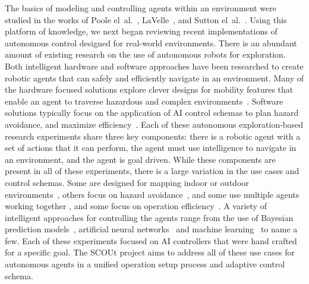 The basics of modeling and controlling agents within an environment were studied in the works of Poole el~al.~\cite{poole_artificial_2010}, LaVelle~\cite{lavalle_planning_2006}, and Sutton el~al.~\cite{sutton_reinforcement_1998}.
Using this platform of knowledge, we next began reviewing recent implementations of autonomous control designed for real-world environments.
There is an abundant amount of existing research on the use of autonomous robots for exploration.
Both intelligent hardware and software approaches have been researched to create robotic agents that can safely and efficiently navigate in an environment.
Many of the hardware focused solutions explore clever designs for mobility features that enable an agent to traverse hazardous and complex environments~\cite{kossett_robust_2011, hopkins_survey_2009, haldane_animal-inspired_2013, hoover_bio-inspired_2010, latscha_design_2014, clark_evolving_2017, smith_tri-wheel:_2015, clark_toward_2006}.
Software solutions typically focus on the application of AI control schemas to plan hazard avoidance, and maximize efficiency~\cite{christensen_multi-robot_2017, tai_autonomous_2017, stachniss_exploration_2004, clark_mobile_2007, perea_strom_robust_2017, fink_tier-scalable_2007, bai_toward_2017}.
Each of these autonomous exploration-based research experiments share three key components: there is a robotic agent with a set of actions that it can perform, the agent must use intelligence to navigate in an environment, and the agent is goal driven.
While these components are present in all of these experiments, there is a large variation in the use cases and control schemas.
Some are designed for mapping indoor or outdoor environments~\cite{tai_autonomous_2017,  stachniss_exploration_2004, perea_strom_robust_2017}, others focus on hazard avoidance~\cite{christensen_multi-robot_2017, fink_tier-scalable_2007}, and some use multiple agents working together \cite{christensen_multi-robot_2017, clark_mobile_2007}, and some focus on operation efficiency~\cite{bai_toward_2017}.
A variety of intelligent approaches for controlling the agents range from the use of Bayesian prediction models~\cite{christensen_multi-robot_2017}, artificial neural networks~\cite{tai_autonomous_2017} and machine learning~\cite{bai_toward_2017} to name a few.
Each of these experiments focused on AI controllers that were hand crafted for a specific goal.
The SCOUt project aims to address all of these use cases for autonomous agents in a unified operation setup process and adaptive control schema.

